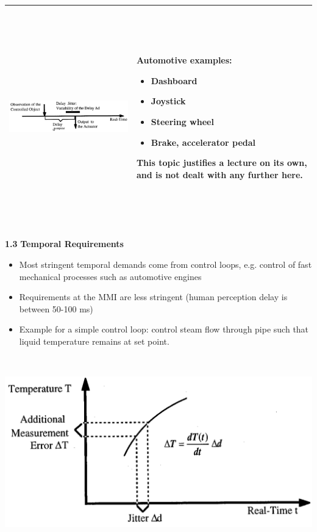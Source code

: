\begin{longtable}[c]{@{}ll@{}}
\toprule
\includegraphics[width=5.14375in,height=3.70694in]{media/Fig_1_5.png} &
Automotive examples:

\begin{itemize}
\item
  Dashboard
\item
  Joystick
\item
  Steering wheel
\item
  Brake, accelerator pedal
\end{itemize}

This topic justifies a lecture on its own, and is not dealt with any
further here.\tabularnewline
\bottomrule
\end{longtable}

\textbf{1.3} \protect\hypertarget{teil4}{}{}\textbf{Temporal
Requirements}

\begin{itemize}
\item
  Most stringent temporal demands come from control loops, e.g. control
  of fast mechanical processes such as automotive engines
\item
  Requirements at the MMI are less stringent (human perception delay is
  between 50-100 ms)
\item
  Example for a simple control loop: control steam flow through pipe
  such that liquid temperature remains at set point.
\end{itemize}

\includegraphics[width=7.39792in,height=3.25903in]{media/Fig_1_6.png}

